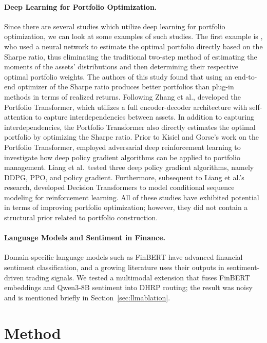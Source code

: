 \documentclass{article}
\begin{document}
\paragraph{Deep Learning for Portfolio Optimization.} Since there are several studies which utilize deep learning for portfolio optimization, we can look at some examples of such studies. The first example is \citet{Zhang2020}, who used a neural network to estimate the optimal portfolio directly based on the Sharpe ratio, thus eliminating the traditional two-step method of estimating the moments of the assets' distributions and then determining their respective optimal portfolio weights. The authors of this study found that using an end-to-end optimizer of the Sharpe ratio produces better portfolios than plug-in methods in terms of realized returns. Following Zhang et al., \citet{KisielGorse2022} developed the Portfolio Transformer, which utilizes a full encoder-decoder architecture with self-attention to capture interdependencies between assets. In addition to capturing interdependencies, the Portfolio Transformer also directly estimates the optimal portfolio by optimizing the Sharpe ratio. Prior to Kisiel and Gorse's work on the Portfolio Transformer, \citet{Liang2018} employed adversarial deep reinforcement learning to investigate how deep policy gradient algorithms can be applied to portfolio management. Liang et al.\ tested three deep policy gradient algorithms, namely DDPG, PPO, and policy gradient. Furthermore, subsequent to Liang et al.'s research, \citet{Chen2021} developed Decision Transformers to model conditional sequence modeling for reinforcement learning. All of these studies have exhibited potential in terms of improving portfolio optimization; however, they did not contain a structural prior related to portfolio construction.

\paragraph{Language Models and Sentiment in Finance.} Domain-specific language models such as FinBERT \citep{Huang2023} have advanced financial sentiment classification, and a growing literature uses their outputs in sentiment-driven trading signals. We tested a multimodal extension that fuses FinBERT embeddings and Qwen3-8B \citep{Qwen2025} sentiment into DHRP routing; the result was noisy and is mentioned briefly in Section~\ref{sec:llmablation}.

\section{Method}
\label{sec:method}
\end{document}

